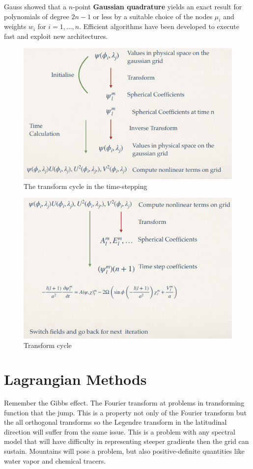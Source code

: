 Gauss showed that a $n$-point \textbf{Gaussian quadrature} yields an exact result for polynomials of degree $2n-1$ or less by a suitable choice of the nodes $\mu_i$ and weights $w_i$ for $i=1,\dots,n$. Efficient algorithms have been developed to execute fast and exploit new architectures.


\begin{figure}[h!]
	\centering
	\includegraphics[width=0.5\linewidth]{uploads/Screenshot 2024-11-19 125912.png}
	\caption{The transform cycle in the time-stepping}
	\label{fig:transform cycle}
\end{figure}
\begin{figure}[h!]
	\centering
	\includegraphics[width=0.5\linewidth]{uploads/Screenshot 2024-11-19 130025.png}
	\caption{Transform cycle}
	\label{fig:transform cycle2}
\end{figure}


\section{Lagrangian Methods}
Remember the Gibbs effect. The Fourier transform at problems in
transforming function that the jump. This is a property not only of the
Fourier transform but the all orthogonal transforms so the Legendre
transform in the latitudinal direction will suffer from the same issue. This
is a problem with any spectral model that will have difficulty in
representing steeper gradients then the grid can sustain.
Mountains will pose a problem, but also positive-definite quantities like
water vapor and chemical tracers.

